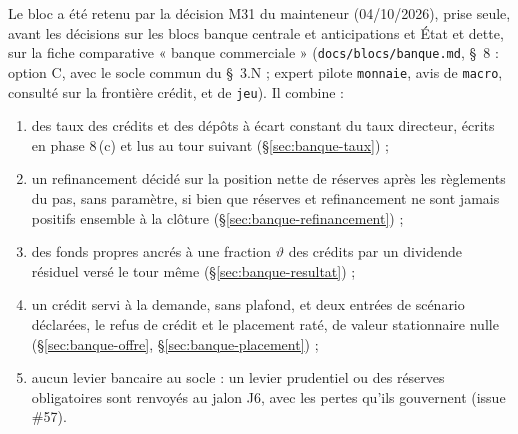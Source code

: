 \documentclass[11pt,a4paper]{article}
\begin{document}
\begin{proposee}
Le bloc a été retenu par la décision M31 du mainteneur (04/10/2026), prise seule, avant les décisions sur les blocs banque centrale et anticipations et État et dette, sur la fiche comparative « banque commerciale » (\nolinkurl{docs/blocs/banque.md}, \S~8 : option C, avec le socle commun du \S~3.N ; expert pilote \texttt{monnaie}, avis de \texttt{macro}, consulté sur la frontière crédit, et de \texttt{jeu}). Il combine :
\begin{enumerate}[label=(\alph*)]
\item des taux des crédits et des dépôts à écart constant du taux directeur, écrits en phase 8\,(c) et lus au tour suivant (\S\ref{sec:banque-taux}) ;
\item un refinancement décidé sur la position nette de réserves après les règlements du pas, sans paramètre, si bien que réserves et refinancement ne sont jamais positifs ensemble à la clôture (\S\ref{sec:banque-refinancement}) ;
\item des fonds propres ancrés à une fraction $\vartheta$ des crédits par un dividende résiduel versé le tour même (\S\ref{sec:banque-resultat}) ;
\item un crédit servi à la demande, sans plafond, et deux entrées de scénario déclarées, le refus de crédit et le placement raté, de valeur stationnaire nulle (\S\ref{sec:banque-offre}, \S\ref{sec:banque-placement}) ;
\item aucun levier bancaire au socle : un levier prudentiel ou des réserves obligatoires sont renvoyés au jalon J6, avec les pertes qu'ils gouvernent (issue \#57).
\end{enumerate}

\end{proposee}
\end{document}
